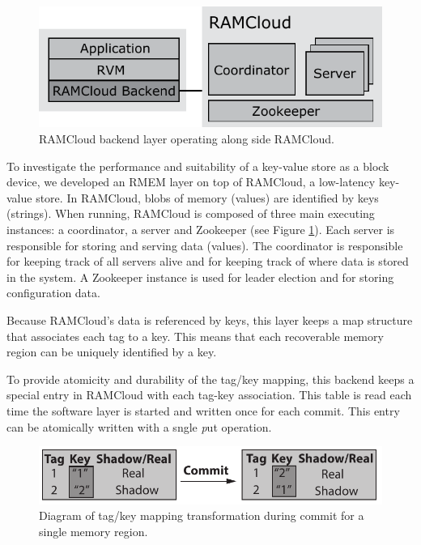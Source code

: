 
\begin{figure}[t!]
\begin{center}
\includegraphics[scale=0.60]{graphs/ramcloud_backend_design_final.pdf}
\end{center}
\caption{RAMCloud backend layer operating along side RAMCloud.}
\label{fig:ramcloud_backend_design}
\end{figure}

To investigate the performance and suitability of a key-value store as a block
device, we developed an RMEM layer on top of RAMCloud, a low-latency
key-value store.  In RAMCloud, blobs of memory (values) are identified by keys
(strings). When running, RAMCloud is composed of three main executing
instances: a coordinator, a server and Zookeeper (see Figure
\ref{fig:ramcloud_backend_design}).  Each server is responsible for storing and
serving data (values). The coordinator is responsible for keeping track of all
servers alive and for keeping track of where data is stored in the system.  A
Zookeeper instance is used for leader election and for storing configuration
data.

Because RAMCloud's data is referenced by keys, this layer keeps a map structure
that associates each tag to a key. This means that each recoverable memory
region can be uniquely identified by a key.

To provide atomicity and durability of the tag/key mapping, this backend keeps
a special entry in RAMCloud with each tag-key association. This table is read
each time the software layer is started and written once for each commit. This
entry can be atomically written with a sngle {\emph put} operation.

\begin{figure}[t!]
\begin{center}
\includegraphics[scale=0.60]{graphs/ramcloud_backend_commit.pdf}
\end{center}
\caption{Diagram of tag/key mapping transformation during commit for a single memory region.}
\label{fig:ramcloud_backend_commit}
\end{figure}

